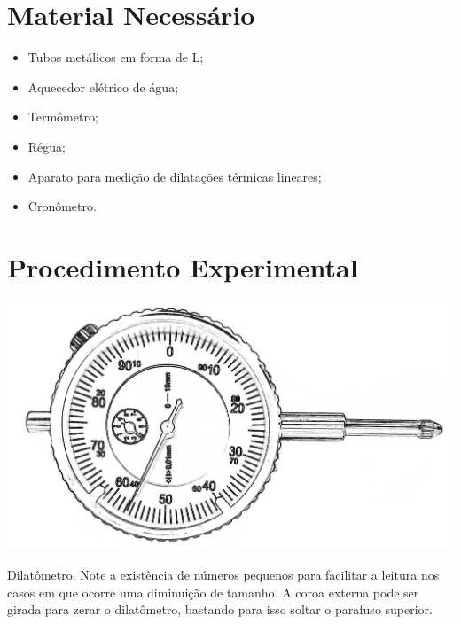 \section{Material Necessário}

\begin{itemize}
	\item Tubos metálicos em forma de L;
	\item Aquecedor elétrico de água;
	\item Termômetro;
	\item Régua;
	\item Aparato para medição de dilatações térmicas lineares;
	\item Cronômetro.
\end{itemize}

\section{Procedimento Experimental}
\begin{marginfigure}
	\includegraphics[width=\textwidth]{Ilustrations/Dilatometro.png}
	\caption{Dilatômetro. Note a existência de números pequenos para facilitar a leitura nos casos em que ocorre uma diminuição de tamanho. A coroa externa pode ser girada para zerar o dilatômetro, bastando para isso soltar o parafuso superior.}
\end{marginfigure}

